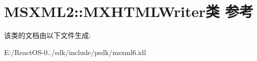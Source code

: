 \hypertarget{class_m_s_x_m_l2_1_1_m_x_h_t_m_l_writer}{}\section{M\+S\+X\+M\+L2\+:\+:M\+X\+H\+T\+M\+L\+Writer类 参考}
\label{class_m_s_x_m_l2_1_1_m_x_h_t_m_l_writer}


该类的文档由以下文件生成\+:\begin{DoxyCompactItemize}
\item 
E\+:/\+React\+O\+S-\/0../sdk/include/psdk/msxml6.\+idl\end{DoxyCompactItemize}
